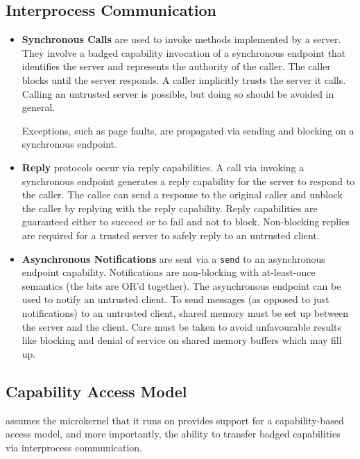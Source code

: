 \subsection{Interprocess Communication}

\begin{itemize}

	\item
	\textbf{Synchronous Calls} are used to invoke methods implemented by a server. They involve a badged capability invocation of a synchronous endpoint that identifies the server and represents the authority of the caller.	The caller blocks until the server responds. A caller implicitly trusts the server it calls. Calling an untrusted server is possible, but doing so should be avoided in general.

	Exceptions, such as page faults, are propagated via sending and blocking on	a synchronous endpoint.

	\item
	\textbf{Reply} protocols occur via reply capabilities. A call via invoking a synchronous endpoint generates a reply	capability for the server to respond to the caller. The callee can send a response to the original caller and unblock the caller by replying	with the reply capability. Reply capabilities are guaranteed either to succeed	or to fail and not to block. Non-blocking replies are required for a trusted server to safely reply to an untrusted client.

	\item
	\textbf{Asynchronous Notifications} are sent via a \texttt{send} to an asynchronous endpoint capability. Notifications are non-blocking
with at-least-once semantics (the bits are OR'd together). The asynchronous endpoint can be used to notify an untrusted client. To send messages (as opposed to just notifications) to an untrusted client, shared memory must be set up between the server and the client. Care must be taken to avoid unfavourable results	like blocking and denial of service on shared memory buffers which may fill up.

\end{itemize}

\subsection{Capability Access Model}

 assumes the microkernel that it runs on provides support for a capability-based access model, and more importantly, the ability to transfer badged capabilities via interprocess communication. 

